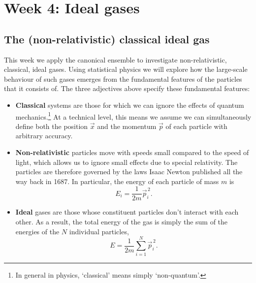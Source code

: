 \renewcommand{\thisweek}{MATH327 Week 4}
\renewcommand{\moddate}{Last modified 10 Feb.~2021}
\setcounter{section}{4}
\setcounter{subsection}{0}
{}
\section*{Week 4: Ideal gases}

\subsection{The (non-relativistic) classical ideal gas}
This week we apply the canonical ensemble to investigate non-relativistic, classical, ideal gases.
Using statistical physics we will explore how the large-scale behaviour of such gases emerges from the fundamental features of the particles that it consists of.
The three adjectives above specify these fundamental features: \\[-24 pt]
\begin{itemize}
  \item \textbf{Classical} systems are those for which we can ignore the effects of quantum mechanics.\footnote{In general in physics, `classical' means simply `non-quantum'.}
        At a technical level, this means we assume we can simultaneously define both the position $\vec x$ and the momentum $\vec p$ of each particle with arbitrary accuracy.
  \item \textbf{Non-relativistic} particles move with speeds small compared to the speed of light, which allows us to ignore small effects due to special relativity.
        The particles are therefore governed by the laws Isaac Newton published all the way back in 1687.
        In particular, the energy of each particle of mass $m$ is
        \begin{equation*}
          E_i = \frac{1}{2m} \vec{p}_i^{\,2}.
        \end{equation*}
  \item \textbf{Ideal} gases are those whose constituent particles don't interact with each other.
        As a result, the total energy of the gas is simply the sum of the energies of the $N$ individual particles,
        \begin{equation}
          E = \frac{1}{2m} \sum_{i = 1}^N \vec{p}_i^{\,2}.
        \end{equation}
\end{itemize}

